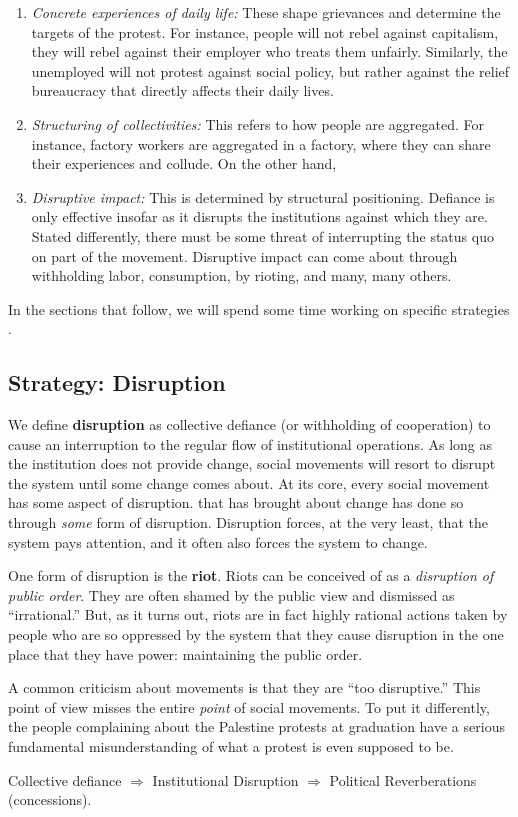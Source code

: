 \begin{enumerate}
    \item 
    \textit{Concrete experiences of daily life:}
    These shape grievances and determine the targets of the protest.
    For instance, people will not rebel against capitalism, they will rebel against their employer who treats them unfairly.
    Similarly, the unemployed will not protest against social policy, but rather against the relief bureaucracy that directly affects their daily lives.
    \item 
    \textit{Structuring of collectivities:} 
    This refers to how people are aggregated.
    For instance, factory workers are aggregated in a factory, where they can share their experiences and collude.
    On the other hand, 
    \item 
    \textit{Disruptive impact:}
    This is determined by structural positioning.
    Defiance is only effective insofar as it disrupts the institutions against which they are.
    Stated differently, there must be some threat of interrupting the status quo on part of the movement.
    Disruptive impact can come about through withholding labor, consumption, by rioting, and many, many others.
\end{enumerate}
In the sections that follow, we will spend some time working on specific strategies .

\subsection{Strategy: Disruption}
We define \textbf{disruption} as collective defiance (or withholding of cooperation) to cause an interruption to the regular flow of institutional operations.
As long as the institution does not provide change, social movements will resort to disrupt the system until some change comes about.
At its core, every social movement has some aspect of disruption.
that has brought about change has done so through \textit{some} form of disruption.
Disruption forces, at the very least, that the system pays attention, and it often also forces the system to change.

One form of disruption is the \textbf{riot}.
Riots can be conceived of as a \textit{disruption of public order}.
They are often shamed by the public view and dismissed as   ``irrational.''
But, as it turns out, riots are in fact highly rational actions taken by people who are so oppressed by the system that they cause disruption in the one place that they have power:
maintaining the public order.

A common criticism about movements is that they are ``too disruptive.''
This point of view misses the entire \textit{point} of social movements.
To put it differently, the people complaining about the Palestine protests at graduation have a serious fundamental misunderstanding of what a protest is even supposed to be.


\begin{center}
    Collective defiance $\Rightarrow$ Institutional Disruption $\Rightarrow$ Political Reverberations (concessions).
\end{center}